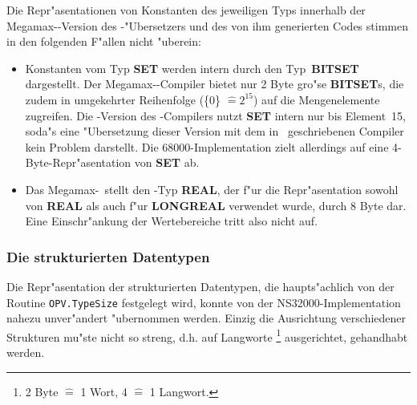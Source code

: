 \medskip
Die Repr"asentationen von Konstanten des jeweiligen Typs innerhalb der
Megamax-\modula-Version des \oberon-"Ubersetzers und des von ihm generierten
Codes stimmen in den folgenden F"allen nicht "uberein:
\begin{itemize}
\item Konstanten vom Typ {\bf SET} werden intern durch den Typ~{\bf BITSET}
  dargestellt.
  Der Megamax-\modula-Compiler bietet nur 2 Byte gro"se {\bf BITSET}s,
  die zudem in umgekehrter Reihenfolge (\{0\} $\widehat{=} 2^{15}$)
  auf die Mengenelemente zugreifen.
  Die \oberon-Version des \oberon-Compilers nutzt {\bf SET} intern nur
  bis Element~15, soda"s eine "Ubersetzung dieser Version mit dem in
  \modula\ geschriebenen Compiler kein Problem darstellt.
  Die 68000-Implementation zielt allerdings auf eine 4-Byte-Repr"asentation
  von {\bf SET} ab.
\item Das Megamax-\modula\ stellt den \modula-Typ {\bf REAL}, der f"ur die
  Repr"asentation sowohl von {\bf REAL} als auch f"ur {\bf LONGREAL}
  verwendet wurde, durch 8 Byte dar.
  Eine Einschr"ankung der Wertebereiche tritt also nicht auf.
\end{itemize}

\subsubsection{Die strukturierten Datentypen}
\label{strukturierte Datentypen}

Die Repr"asentation der strukturierten Datentypen, die haupts"achlich
von der Routine {\tt OPV.TypeSize} festgelegt wird, konnte von der
NS32000-Implementation nahezu unver"andert "ubernommen werden.
Einzig die Ausrichtung verschiedener Strukturen mu"ste nicht so
streng, d.h. auf Langworte%
\footnote{2 Byte $\widehat{=}$ 1 Wort, 4 $\widehat{=}$ 1 Langwort.}
ausgerichtet, gehandhabt werden.

